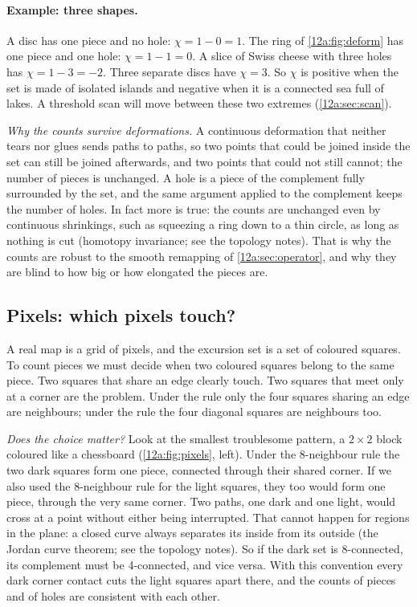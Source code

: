 \paragraph{Example: three shapes.} A disc has one piece and no hole: $\chi=1-0=1$. The ring of
\cref{12a:fig:deform} has one piece and one hole: $\chi=1-1=0$. A slice of Swiss cheese with three holes has
$\chi=1-3=-2$. Three separate discs have $\chi=3$. So $\chi$ is positive when the set is made of isolated
islands and negative when it is a connected sea full of lakes. A threshold scan will move between these
two extremes (\cref{12a:sec:scan}).

\emph{Why the counts survive deformations.} A continuous deformation that neither tears nor glues sends
paths to paths, so two points that could be joined inside the set can still be joined afterwards, and two
points that could not still cannot; the number of pieces is unchanged. A hole is a piece of the complement
fully surrounded by the set, and the same argument applied to the complement keeps the number of holes. In
fact more is true: the counts are unchanged even by continuous shrinkings, such as squeezing a ring down to a
thin circle, as long as nothing is cut (homotopy invariance; see the topology notes). That is why the
counts are robust to the smooth remapping of \cref{12a:sec:operator}, and why they are blind to how big or
how elongated the pieces are.

\subsection{Pixels: which pixels touch?}
\label{12a:sec:pixels}

A real map is a grid of pixels, and the excursion set is a set of coloured squares. To count pieces we
must decide when two coloured squares belong to the same piece. Two squares that share an edge clearly
touch. Two squares that meet only at a corner are the problem. Under the  rule only
the four squares sharing an edge are neighbours; under the  rule the four diagonal
squares are neighbours too.

\emph{Does the choice matter?} Look at the smallest troublesome pattern, a $2\times2$ block coloured like a
chessboard (\cref{12a:fig:pixels}, left). Under the 8-neighbour rule the two dark squares form one piece,
connected through their shared corner. If we also used the 8-neighbour rule for the light squares, they
too would form one piece, through the very same corner. Two paths, one dark and one light, would cross at a
point without either being interrupted. That cannot happen for regions in the plane: a closed curve
always separates its inside from its outside (the Jordan curve theorem; see the topology notes). So if the
dark set is 8-connected, its complement must be 4-connected, and vice versa. With this 
convention every dark corner contact cuts the light squares apart there, and the counts of pieces and of
holes are consistent with each other.

